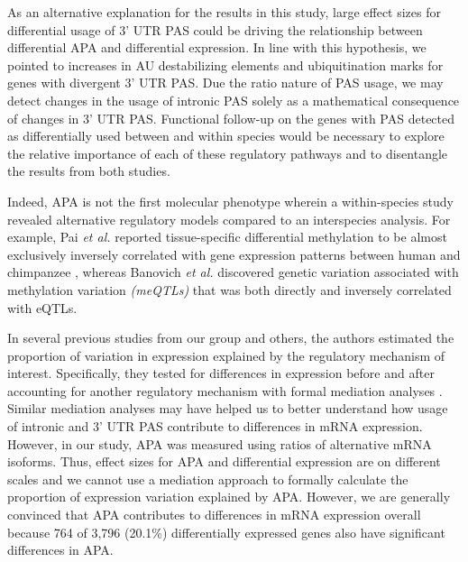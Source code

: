 As an alternative explanation for the results in this study, large effect sizes for differential usage of 3' UTR PAS could be driving the relationship between differential APA and differential expression. In line with this hypothesis, we pointed to increases in AU destabilizing elements and ubiquitination marks for genes with divergent 3' UTR PAS. Due the ratio nature of PAS usage, we may detect changes in the usage of intronic PAS solely as a mathematical consequence of changes in 3' UTR PAS. Functional follow-up on the genes with PAS detected as differentially used between and within species would be necessary to explore the relative importance of each of these regulatory pathways and to disentangle the results from both studies.

Indeed, APA is not the first molecular phenotype wherein a within-species study revealed alternative regulatory models compared to an interspecies analysis. For example, Pai \emph{et al.} reported tissue-specific differential methylation to be almost exclusively inversely correlated with gene expression patterns between human and chimpanzee \citep{enard_differences_2004, pai_genome-wide_2011, weber_distribution_2007}, whereas Banovich \emph{et al.} discovered genetic variation associated with methylation variation \emph{(meQTLs)} that was both directly and inversely correlated with eQTLs. 


In several previous studies from our group and others, the authors estimated the proportion of variation in expression explained by the regulatory mechanism of interest. Specifically, they tested for differences in expression before and after accounting for another regulatory mechanism with formal mediation analyses \citep{blake_comparison_2020, blekhman_segmental_2009, cain_gene_2011,eres_reorganization_2019}. Similar mediation analyses may have helped us to better understand how usage of intronic and 3' UTR PAS contribute to differences in mRNA expression. However, in our study, APA was measured using ratios of alternative mRNA isoforms. Thus, effect sizes for APA and differential expression are on different scales and we cannot use a mediation approach to formally calculate the proportion of expression variation explained by APA. However, we are generally convinced that APA contributes to differences in mRNA expression overall because 764 of 3,796 (20.1\%) differentially expressed genes also have significant differences in APA. 


